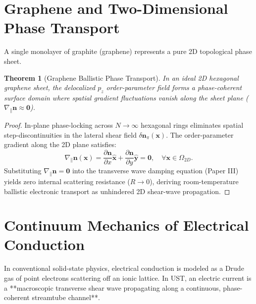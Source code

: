 \documentclass[11pt,a4paper]{article}
\newtheorem{thm}{Theorem}
\begin{document}
	\section{Graphene and Two-Dimensional Phase Transport}
	\label{sec:graphene_transport}
	
	A single monolayer of graphite (graphene) represents a pure 2D topological phase sheet.
	
	\begin{thm}[Graphene Ballistic Phase Transport]
		\label{thm:graphene_transport}
		In an ideal 2D hexagonal graphene sheet, the delocalized $p_z$ order-parameter field forms a phase-coherent surface domain where spatial gradient fluctuations vanish along the sheet plane ($\nabla_{\parallel} \mathbf{n} \approx \mathbf{0}$).
	\end{thm}
	
	\begin{proof}
		In-plane phase-locking across $N \to \infty$ hexagonal rings eliminates spatial step-discontinuities in the lateral shear field $\delta \mathbf{n}_{\pi}(\mathbf{x})$. The order-parameter gradient along the 2D plane satisfies:
		\begin{equation}
			\nabla_{\parallel} \mathbf{n}(\mathbf{x}) = \frac{\partial \mathbf{n}}{\partial x} \hat{\mathbf{x}} + \frac{\partial \mathbf{n}}{\partial y} \hat{\mathbf{y}} = \mathbf{0}, \quad \forall \mathbf{x} \in \Omega_{2D}.
		\end{equation}
		Substituting $\nabla_{\parallel} \mathbf{n} = \mathbf{0}$ into the transverse wave damping equation (Paper III) yields zero internal scattering resistance ($R \to 0$), deriving room-temperature ballistic electronic transport as unhindered 2D shear-wave propagation.
	\end{proof}
	
	\section{Continuum Mechanics of Electrical Conduction}
	\label{sec:electrical_conduction}
	
	In conventional solid-state physics, electrical conduction is modeled as a Drude gas of point electrons scattering off an ionic lattice. In UST, an electric current is a **macroscopic transverse shear wave propagating along a continuous, phase-coherent streamtube channel**.
	
\end{document}
